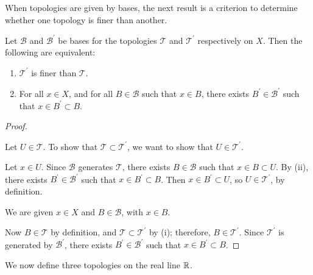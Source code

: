When topologies are given by bases, the next result is a criterion to determine whether one topology is finer than another.

\begin{lemma}
Let $\mathcal{B}$ and $\mathcal{B}^\prime$ be bases for the topologies $\mathcal{T}$ and $\mathcal{T}^\prime$ respectively on $X$. Then the following are equivalent:
\begin{enumerate}[label=(\roman*)]
\item $\mathcal{T}^\prime$ is finer than $\mathcal{T}$.
\item For all $x\in X$, and for all $B\in\mathcal{B}$ such that $x\in B$, there exists $B^\prime\in\mathcal{B}^\prime$ such that $x\in B^\prime\subset B$.
\end{enumerate}
\end{lemma}

\begin{proof} \

 Let $U\in\mathcal{T}$. To show that $\mathcal{T}\subset\mathcal{T}^\prime$, we want to show that $U\in\mathcal{T}^\prime$.

Let $x\in U$. Since $\mathcal{B}$ generates $\mathcal{T}$, there exists $B\in\mathcal{B}$ such that $x\in B\subset U$. By (ii), there exists $B^\prime\in\mathcal{B}^\prime$ such that $x\in B^\prime\subset B$. Then $x\in B^\prime\subset U$, so $U\in\mathcal{T}^\prime$, by definition.

 We are given $x\in X$ and $B\in\mathcal{B}$, with $x\in B$.

Now $B\in\mathcal{T}$ by definition, and $\mathcal{T}\subset\mathcal{T}^\prime$ by (i); therefore, $B\in\mathcal{T}^\prime$. Since $\mathcal{T}^\prime$ is generated by $\mathcal{B}^\prime$, there exists $B^\prime\in\mathcal{B}^\prime$ such that $x\in B^\prime\subset B$.
\end{proof}

We now define three topologies on the real line $\mathbb R$.

